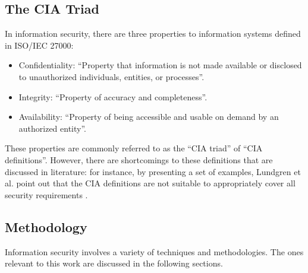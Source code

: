\subsection{The CIA Triad}
In information security, there are three properties to information systems defined in \ac{ISO}/\ac{IEC} 27000:
\begin{itemize}
    \item Confidentiality: \enquote{Property that information is not made available or disclosed to unauthorized individuals, entities, or processes}. \cite{ISOIEC27000}
    \item Integrity: \enquote{Property of accuracy and completeness}. \cite{ISOIEC27000}
    \item Availability: \enquote{Property of being accessible and usable on demand by an authorized entity}. \cite{ISOIEC27000}
\end{itemize}
These properties are commonly referred to as the \enquote{CIA triad} of \enquote{CIA definitions}. However, there are shortcomings to these definitions that are discussed in literature: for instance, by presenting a set of examples, Lundgren et al. point out that the CIA definitions are not suitable to appropriately cover all security requirements \cite{Lundgren2019DefiningIS}.

\subsection{Methodology}
Information security involves a variety of techniques and methodologies. The ones relevant to this work are discussed in the following sections.

